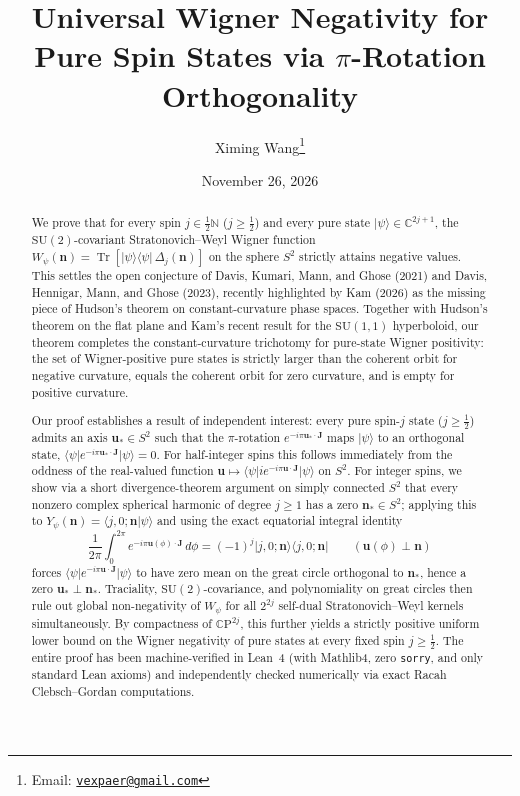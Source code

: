 \documentclass[11pt,a4paper]{article}
\title{\textbf{Universal Wigner Negativity for Pure Spin States via $\pi$-Rotation Orthogonality}}
\author{Ximing Wang\thanks{Email: \href{mailto:vexpaer@gmail.com}{\texttt{vexpaer@gmail.com}}}}
\date{November 26, 2026}
\theoremstyle{remark}
\newcommand{\ket}[1]{\lvert #1 \rangle}
\newcommand{\bra}[1]{\langle #1 \rvert}
\newcommand{\braket}[2]{\langle #1 \vert #2 \rangle}
\newcommand{\Tr}{\operatorname{Tr}}
\newcommand{\bn}{\mathbf{n}}
\newcommand{\bu}{\mathbf{u}}
\newcommand{\bJ}{\mathbf{J}}
\begin{document}
\maketitle

\begin{abstract}
We prove that for every spin $j \in \frac{1}{2}\mathbb{N}$ ($j \ge \frac{1}{2}$) and every pure state $\ket{\psi} \in \mathbb{C}^{2j+1}$, the $\mathrm{SU}(2)$-covariant Stratonovich--Weyl Wigner function $W_\psi(\bn) = \Tr[\ket{\psi}\bra{\psi}\,\Delta_j(\bn)]$ on the sphere $S^2$ strictly attains negative values. This settles the open conjecture of Davis, Kumari, Mann, and Ghose (2021) and Davis, Hennigar, Mann, and Ghose (2023), recently highlighted by Kam (2026) as the missing piece of Hudson's theorem on constant-curvature phase spaces. Together with Hudson's theorem on the flat plane and Kam's recent result for the $\mathrm{SU}(1,1)$ hyperboloid, our theorem completes the constant-curvature trichotomy for pure-state Wigner positivity: the set of Wigner-positive pure states is strictly larger than the coherent orbit for negative curvature, equals the coherent orbit for zero curvature, and is empty for positive curvature.

Our proof establishes a result of independent interest: every pure spin-$j$ state ($j \ge \frac{1}{2}$) admits an axis $\bu_* \in S^2$ such that the $\pi$-rotation $e^{-i\pi \bu_* \cdot \bJ}$ maps $\ket{\psi}$ to an orthogonal state, $\bra{\psi} e^{-i\pi \bu_* \cdot \bJ} \ket{\psi} = 0$. For half-integer spins this follows immediately from the oddness of the real-valued function $\bu \mapsto \bra{\psi} i e^{-i\pi \bu \cdot \bJ} \ket{\psi}$ on $S^2$. For integer spins, we show via a short divergence-theorem argument on simply connected $S^2$ that every nonzero complex spherical harmonic of degree $j \ge 1$ has a zero $\bn_* \in S^2$; applying this to $Y_\psi(\bn) = \braket{j,0;\bn}{\psi}$ and using the exact equatorial integral identity
\[
\frac{1}{2\pi}\int_{0}^{2\pi} e^{-i\pi \bu(\phi)\cdot\bJ}\,d\phi = (-1)^j \ket{j,0;\bn}\bra{j,0;\bn} \qquad (\bu(\phi) \perp \bn)
\]
forces $\bra{\psi} e^{-i\pi \bu \cdot \bJ} \ket{\psi}$ to have zero mean on the great circle orthogonal to $\bn_*$, hence a zero $\bu_* \perp \bn_*$. Traciality, $\mathrm{SU}(2)$-covariance, and polynomiality on great circles then rule out global non-negativity of $W_\psi$ for all $2^{2j}$ self-dual Stratonovich--Weyl kernels simultaneously. By compactness of $\mathbb{C}\mathrm{P}^{2j}$, this further yields a strictly positive uniform lower bound on the Wigner negativity of pure states at every fixed spin $j \ge \frac{1}{2}$. The entire proof has been machine-verified in Lean~4 (with Mathlib4, zero \texttt{sorry}, and only standard Lean axioms) and independently checked numerically via exact Racah Clebsch--Gordan computations.
\end{abstract}
\end{document}
